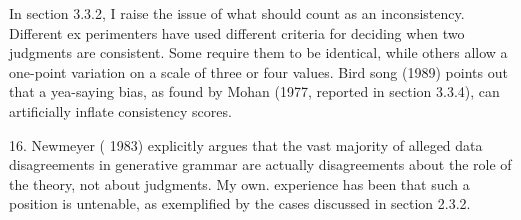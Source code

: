 \begin{listWWNumxviiileveli}
\item 
\begin{styleStandard}
In section 3.3.2, I raise the issue of what should count as an inconsistency. Different ex\- perimenters have used different criteria for deciding when two judgments are consistent. Some require them to be identical, while others allow a one-point variation on a scale of three or four values. Bird\- song (1989) points out that a yea-saying bias, as found by Mohan (1977, reported in section 3.3.4), can artificially inflate consistency scores.
\end{styleStandard}


\end{listWWNumxviiileveli}
\setcounter{listWWNumxixleveli}{5}
\begin{listWWNumxixleveli}
\item 
\setcounter{listWWNumxixlevelii}{2}
\begin{listWWNumxixlevelii}
\item 
\setcounter{listWWNumxixleveliii}{1}
\begin{listWWNumxixleveliii}
\item 
\begin{listWWNumxixleveliv}
\item 
\begin{styleStandard}
16. Newmeyer ( 1983) explicitly argues that the vast majority of alleged data disagreements in generative grammar are actually disagreements about the role of the theory, not about judgments. My own. experience has been that such a position is untenable, as exemplified by the cases discussed in section 2.3.2.
\end{styleStandard}


\end{listWWNumxixleveliv}
\end{listWWNumxixleveliii}
\end{listWWNumxixlevelii}
\end{listWWNumxixleveli}

